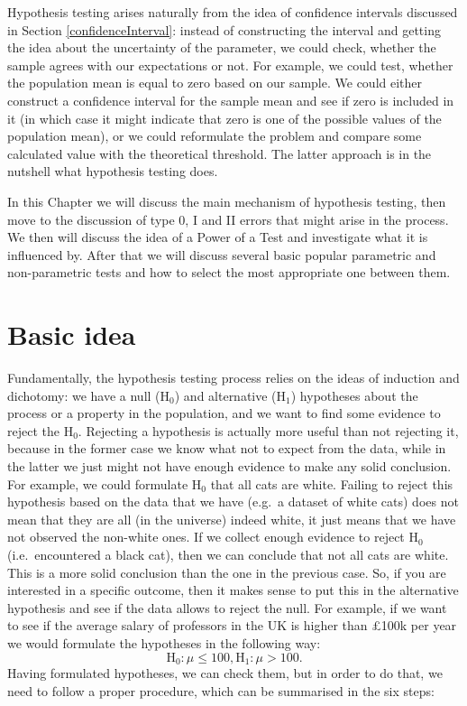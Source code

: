 \documentclass[
]{book}
\theoremstyle{definition}
\theoremstyle{definition}
\theoremstyle{definition}
\theoremstyle{definition}
\theoremstyle{remark}
\begin{document}
Hypothesis testing arises naturally from the idea of confidence intervals discussed in Section \ref{confidenceInterval}: instead of constructing the interval and getting the idea about the uncertainty of the parameter, we could check, whether the sample agrees with our expectations or not. For example, we could test, whether the population mean is equal to zero based on our sample. We could either construct a confidence interval for the sample mean and see if zero is included in it (in which case it might indicate that zero is one of the possible values of the population mean), or we could reformulate the problem and compare some calculated value with the theoretical threshold. The latter approach is in the nutshell what hypothesis testing does.

In this Chapter we will discuss the main mechanism of hypothesis testing, then move to the discussion of type 0, I and II errors that might arise in the process. We then will discuss the idea of a Power of a Test and investigate what it is influenced by. After that we will discuss several basic popular parametric and non-parametric tests and how to select the most appropriate one between them.

\section{Basic idea}\label{hypothesisTestingBasics}

Fundamentally, the hypothesis testing process relies on the ideas of induction and dichotomy: we have a null (\(\mathrm{H}_0\)) and alternative (\(\mathrm{H}_1\)) hypotheses about the process or a property in the population, and we want to find some evidence to reject the \(\mathrm{H}_0\). Rejecting a hypothesis is actually more useful than not rejecting it, because in the former case we know what not to expect from the data, while in the latter we just might not have enough evidence to make any solid conclusion. For example, we could formulate \(\mathrm{H}_0\) that all cats are white. Failing to reject this hypothesis based on the data that we have (e.g.~a dataset of white cats) does not mean that they are all (in the universe) indeed white, it just means that we have not observed the non-white ones. If we collect enough evidence to reject \(\mathrm{H}_0\) (i.e.~encountered a black cat), then we can conclude that not all cats are white. This is a more solid conclusion than the one in the previous case. So, if you are interested in a specific outcome, then it makes sense to put this in the alternative hypothesis and see if the data allows to reject the null. For example, if we want to see if the average salary of professors in the UK is higher than £100k per year we would formulate the hypotheses in the following way:
\begin{equation*}
    \mathrm{H}_0: \mu \leq 100, \mathrm{H}_1: \mu > 100.
\end{equation*}
Having formulated hypotheses, we can check them, but in order to do that, we need to follow a proper procedure, which can be summarised in the six steps:
\end{document}
